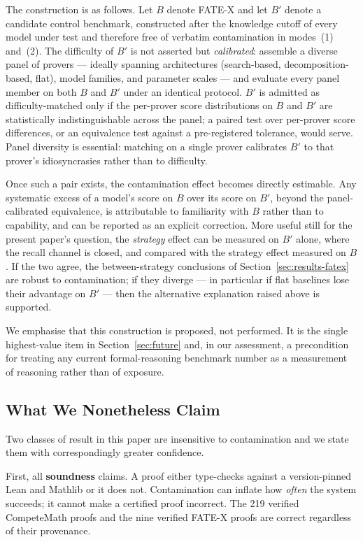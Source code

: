 \documentclass[12pt, a4paper]{article}
\begin{document}
The construction is as follows. Let $B$ denote FATE-X and let $B'$ denote a
candidate control benchmark, constructed after the knowledge cutoff of every
model under test and therefore free of verbatim contamination in modes~(1)
and~(2). The difficulty of $B'$ is not asserted but \emph{calibrated}:
assemble a diverse panel of provers --- ideally spanning architectures
(search-based, decomposition-based, flat), model families, and parameter
scales --- and evaluate every panel member on both $B$ and $B'$ under an
identical protocol. $B'$ is admitted as difficulty-matched only if the
per-prover score distributions on $B$ and $B'$ are statistically
indistinguishable across the panel; a paired test over per-prover score
differences, or an equivalence test against a pre-registered tolerance,
would serve. Panel diversity is essential: matching on a single prover
calibrates $B'$ to that prover's idiosyncrasies rather than to difficulty.

Once such a pair exists, the contamination effect becomes directly
estimable. Any systematic excess of a model's score on $B$ over its score on
$B'$, beyond the panel-calibrated equivalence, is attributable to
familiarity with $B$ rather than to capability, and can be reported as an
explicit correction. More useful still for the present paper's question, the
\emph{strategy} effect can be measured on $B'$ alone, where the recall
channel is closed, and compared with the strategy effect measured on $B$. If
the two agree, the between-strategy conclusions of
Section~\ref{sec:results-fatex} are robust to contamination; if they
diverge --- in particular if flat baselines lose their advantage on $B'$ ---
then the alternative explanation raised above is supported.

We emphasise that this construction is proposed, not performed. It is the
single highest-value item in Section~\ref{sec:future} and, in our
assessment, a precondition for treating any current formal-reasoning
benchmark number as a measurement of reasoning rather than of exposure.

\subsection{What We Nonetheless Claim}

Two classes of result in this paper are insensitive to contamination and we
state them with correspondingly greater confidence.

First, all \textbf{soundness} claims. A proof either type-checks against a
version-pinned Lean and Mathlib or it does not. Contamination can inflate
how \emph{often} the system succeeds; it cannot make a certified proof
incorrect. The 219 verified CompeteMath proofs and the nine verified FATE-X
proofs are correct regardless of their provenance.
\end{document}
